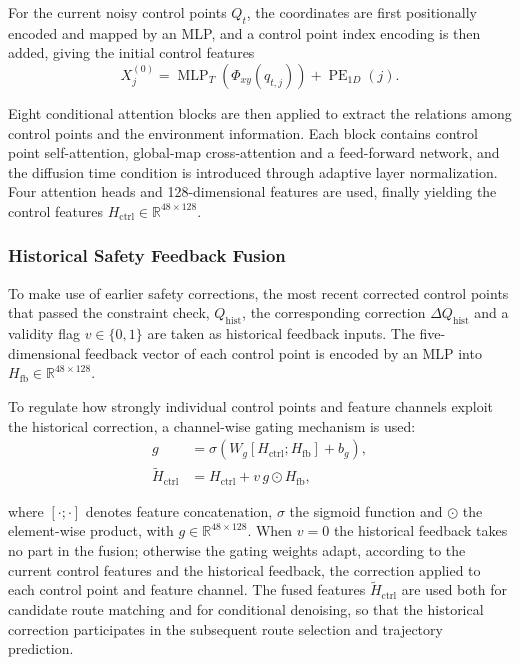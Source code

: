 \documentclass[journal]{IEEEtran}
\newcommand{\R}{\mathbb{R}}
\newcommand{\ctrl}{H_{\mathrm{ctrl}}}
\newcommand{\ctrlf}{\widetilde{H}_{\mathrm{ctrl}}}
\begin{document}
For the current noisy control points $Q_t$, the coordinates are first
positionally encoded and mapped by an MLP, and a control point index encoding
is then added, giving the initial control features
\begin{equation}
X_j^{(0)}=\operatorname{MLP}_{T}\!\left(\Phi_{xy}(q_{t,j})\right)
+\operatorname{PE}_{1D}(j).
\end{equation}

Eight conditional attention blocks are then applied to extract the relations
among control points and the environment information. Each block contains
control point self-attention, global-map cross-attention and a feed-forward
network, and the diffusion time condition is introduced through adaptive layer
normalization. Four attention heads and 128-dimensional features are used,
finally yielding the control features $\ctrl\in\R^{48\times128}$.

\subsubsection{Historical Safety Feedback Fusion}
To make use of earlier safety corrections, the most recent corrected control
points that passed the constraint check, $Q_{\mathrm{hist}}$, the corresponding
correction $\Delta Q_{\mathrm{hist}}$ and a validity flag $v\in\{0,1\}$ are
taken as historical feedback inputs. The five-dimensional feedback vector of
each control point is encoded by an MLP into
$H_{\mathrm{fb}}\in\R^{48\times128}$.

To regulate how strongly individual control points and feature channels exploit
the historical correction, a channel-wise gating mechanism is used:
\begin{equation}
\begin{aligned}
g&=\sigma\!\left(W_g[\ctrl;H_{\mathrm{fb}}]+b_g\right),\\
\ctrlf&=\ctrl+v\,g\odot H_{\mathrm{fb}},
\end{aligned}
\end{equation}

where $[\cdot;\cdot]$ denotes feature concatenation, $\sigma$ the sigmoid
function and $\odot$ the element-wise product, with
$g\in\R^{48\times128}$. When $v=0$ the historical feedback takes no part in the
fusion; otherwise the gating weights adapt, according to the current control
features and the historical feedback, the correction applied to each control
point and feature channel. The fused features $\ctrlf$ are used both for
candidate route matching and for conditional denoising, so that the historical
correction participates in the subsequent route selection and trajectory
prediction.
\end{document}
